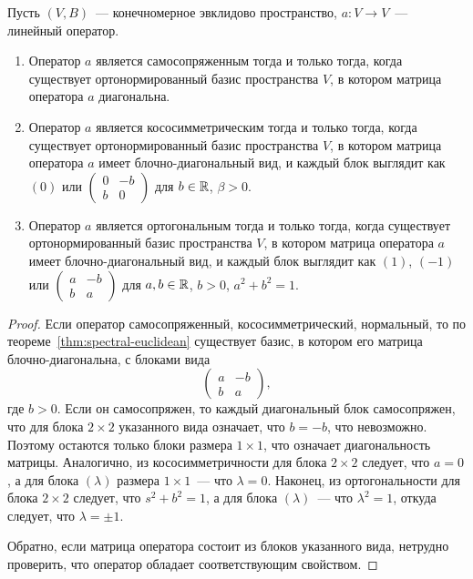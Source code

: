 \begin{theorem}\label{thm:euclidean_canonical_forms}
Пусть $(V,B)$~--- конечномерное эвклидово пространство,
$a\colon V\to V$~--- линейный оператор.
\begin{enumerate}
\item Оператор $a$ является самосопряженным тогда и
только тогда, когда существует ортонормированный базис пространства
$V$, в котором матрица оператора $a$ диагональна.
\item Оператор $a$ является кососимметрическим тогда и
только тогда, когда существует ортонормированный базис пространства
$V$, в котором матрица оператора $a$ имеет блочно-диагональный
вид, и каждый блок выглядит как $(0)$ или  $\begin{pmatrix} 0 & -b
  \\ b & 0\end{pmatrix}$ для $b\in\mathbb R$, $\beta > 0$.
\item Оператор $a$ является ортогональным тогда и
только тогда, когда существует ортонормированный базис пространства
$V$, в котором матрица оператора $a$ имеет блочно-диагональный
вид, и каждый блок выглядит как $(1)$, $(-1)$
или $\begin{pmatrix}a&-b\\ b & a\end{pmatrix}$ для
$a,b\in\mathbb R$, $b > 0$, $a^2 + b^2 = 1$.
\end{enumerate}
\end{theorem}
\begin{proof}
Если оператор самосопряженный, кососимметрический, нормальный, то по
теореме~\ref{thm:spectral-euclidean} существует базис, в котором его
матрица блочно-диагональна, с блоками вида
$$
\begin{pmatrix}
a & -b\\
b & a
\end{pmatrix},
$$
где $b>0$.
Если он самосопряжен, то каждый диагональный блок самосопряжен, что
для блока $2\times 2$ указанного вида означает, что $b=-b$,
что невозможно. Поэтому остаются только блоки размера $1\times 1$,
что означает диагональность матрицы. Аналогично, из кососимметричности
для блока $2\times 2$ следует, что $a=0$, а для блока $(\lambda)$
размера $1\times 1$~--- что $\lambda = 0$. Наконец, из ортогональности
для блока $2\times 2$ следует, что $s^2+b^2=1$, а для блока
$(\lambda)$~--- что $\lambda^2=1$, откуда следует, что $\lambda=\pm 1$.

Обратно, если матрица оператора состоит из блоков указанного вида,
нетрудно проверить, что оператор обладает соответствующим свойством.
\end{proof}

